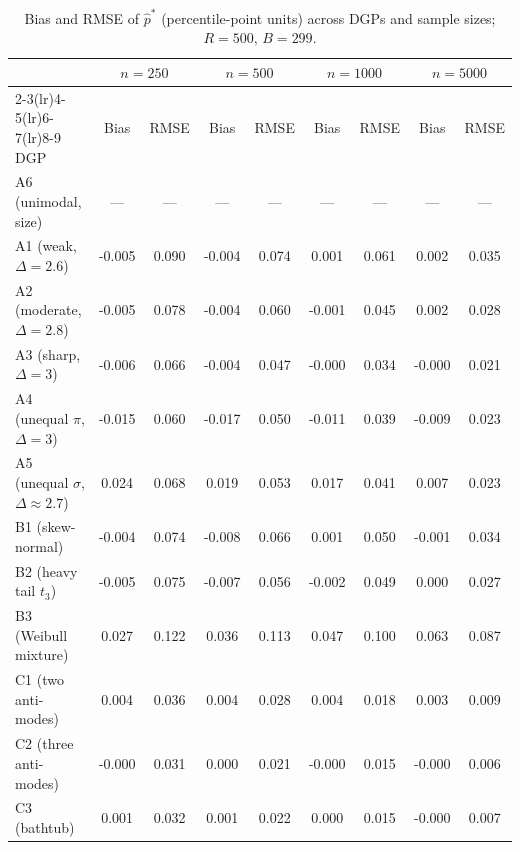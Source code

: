 \clearpage
\begin{table}[p]
\centering
\caption{Bias and RMSE of $\hat p^*$ (percentile-point units)
across DGPs and sample sizes; $R=500$, $B=299$.}
\label{tab:bias_rmse}
\begin{tabular}{lcccccccc}
\toprule
 & \multicolumn{2}{c}{$n=250$} & \multicolumn{2}{c}{$n=500$} & \multicolumn{2}{c}{$n=1000$} & \multicolumn{2}{c}{$n=5000$}\\
\cmidrule(lr){2-3}\cmidrule(lr){4-5}\cmidrule(lr){6-7}\cmidrule(lr){8-9}
DGP & Bias & RMSE & Bias & RMSE & Bias & RMSE & Bias & RMSE\\
\midrule
A6 (unimodal, size) & --- & --- & --- & --- & --- & --- & --- & ---\\
A1 (weak, $\Delta=2.6$) & -0.005 & 0.090 & -0.004 & 0.074 & 0.001 & 0.061 & 0.002 & 0.035\\
A2 (moderate, $\Delta=2.8$) & -0.005 & 0.078 & -0.004 & 0.060 & -0.001 & 0.045 & 0.002 & 0.028\\
A3 (sharp, $\Delta=3$) & -0.006 & 0.066 & -0.004 & 0.047 & -0.000 & 0.034 & -0.000 & 0.021\\
A4 (unequal $\pi$, $\Delta=3$) & -0.015 & 0.060 & -0.017 & 0.050 & -0.011 & 0.039 & -0.009 & 0.023\\
A5 (unequal $\sigma$, $\Delta\approx2.7$) & 0.024 & 0.068 & 0.019 & 0.053 & 0.017 & 0.041 & 0.007 & 0.023\\
B1 (skew-normal) & -0.004 & 0.074 & -0.008 & 0.066 & 0.001 & 0.050 & -0.001 & 0.034\\
B2 (heavy tail $t_3$) & -0.005 & 0.075 & -0.007 & 0.056 & -0.002 & 0.049 & 0.000 & 0.027\\
B3 (Weibull mixture) & 0.027 & 0.122 & 0.036 & 0.113 & 0.047 & 0.100 & 0.063 & 0.087\\
C1 (two anti-modes) & 0.004 & 0.036 & 0.004 & 0.028 & 0.004 & 0.018 & 0.003 & 0.009\\
C2 (three anti-modes) & -0.000 & 0.031 & 0.000 & 0.021 & -0.000 & 0.015 & -0.000 & 0.006\\
C3 (bathtub) & 0.001 & 0.032 & 0.001 & 0.022 & 0.000 & 0.015 & -0.000 & 0.007\\
\bottomrule
\end{tabular}
\end{table}
